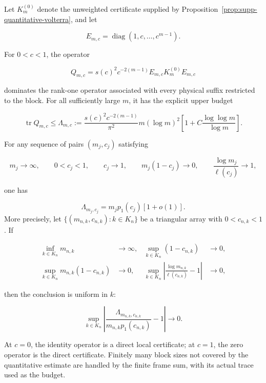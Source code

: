 \begin{proposition}
\label{prop:supp-weighted-volterra-certificate}
Let \(K_m^{(0)}\) denote the unweighted certificate supplied by
Proposition~\ref{prop:supp-quantitative-volterra}, and let

\[
 E_{m,c}=\operatorname{diag}(1,c,\ldots,c^{m-1}).
\]

For \(0<c<1\), the operator

\[
 Q_{m,c}=s(c)^2c^{-2(m-1)}
 E_{m,c}K_m^{(0)}E_{m,c}
\]

dominates the rank-one operator associated with every physical suffix
restricted to the block. For all sufficiently large \(m\), it has the explicit
upper budget

\[
 \operatorname{tr}Q_{m,c}\le\Lambda_{m,c}:=
 \frac{s(c)^2c^{-2(m-1)}}{\pi^2}
 m(\log m)^2
 \left[1+C\frac{\log\log m}{\log m}\right].
\]

For any sequence of pairs \((m_j,c_j)\) satisfying

\[
 m_j\to\infty,\qquad 0<c_j<1,\qquad c_j\to1,
 \qquad m_j(1-c_j)\to0,
 \qquad \frac{\log m_j}{\ell(c_j)}\to1,
\]

one has

\[
 \Lambda_{m_j,c_j}=m_jp_1(c_j)[1+o(1)].
\]
More precisely, let
\(\{(m_{n,k},c_{n,k}):k\in K_n\}\) be a triangular array with
\(0<c_{n,k}<1\). If

\[
\begin{aligned}
\inf_{k\in K_n}m_{n,k}&\longrightarrow\infty,
&\sup_{k\in K_n}(1-c_{n,k})&\longrightarrow0,\\
\sup_{k\in K_n}m_{n,k}(1-c_{n,k})&\longrightarrow0,
&\sup_{k\in K_n}
\left|\frac{\log m_{n,k}}{\ell(c_{n,k})}-1\right|&\longrightarrow0,
\end{aligned}
\]

then the conclusion is uniform in \(k\):

\[
\sup_{k\in K_n}
\left|
\frac{\Lambda_{m_{n,k},c_{n,k}}}
{m_{n,k}p_1(c_{n,k})}-1
\right|\longrightarrow0.
\]

At \(c=0\), the identity operator is a direct local certificate; at \(c=1\),
the zero operator is the direct certificate.  Finitely many block sizes not
covered by the quantitative estimate are handled by the finite frame sum,
with its actual trace used as the budget.
\end{proposition}

